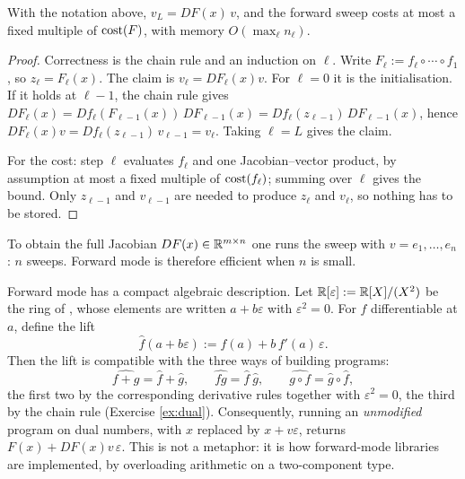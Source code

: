 \documentclass[11pt,a4paper]{article}
\begin{document}
\begin{proposition}\label{prop:forward}
With the notation above, $v_L = DF(x)\,v$, and the forward sweep costs at most a fixed multiple of
$\operatorname{cost}(F)$, with memory $O(\max_\ell n_\ell)$.
\end{proposition}

\begin{proof}
Correctness is the chain rule and an induction on $\ell$. Write $F_\ell := f_\ell \circ \cdots \circ f_1$,
so $z_\ell = F_\ell(x)$. The claim is $v_\ell = DF_\ell(x)v$. For $\ell = 0$ it is the initialisation.
If it holds at $\ell-1$, the chain rule gives
$DF_\ell(x) = Df_\ell(F_{\ell-1}(x))\, DF_{\ell-1}(x) = Df_\ell(z_{\ell-1})\, DF_{\ell-1}(x)$,
hence $DF_\ell(x)v = Df_\ell(z_{\ell-1})\,v_{\ell-1} = v_\ell$. Taking $\ell = L$ gives the claim.

For the cost: step $\ell$ evaluates $f_\ell$ and one Jacobian--vector product, by assumption at most
a fixed multiple of $\operatorname{cost}(f_\ell)$; summing over $\ell$ gives the bound. Only $z_{\ell-1}$ and
$v_{\ell-1}$ are needed to produce $z_\ell$ and $v_\ell$, so nothing has to be stored.
\end{proof}

To obtain the full Jacobian $DF(x) \in \mathbb{R}^{m \times n}$ one runs the sweep with $v = e_1,\dots,e_n$:
$n$ sweeps. Forward mode is therefore efficient when $n$ is small.

\begin{remark}\label{rem:dual}
Forward mode has a compact algebraic description. Let $\mathbb{R}[\varepsilon] := \mathbb{R}[X]/(X^2)$ be the ring
of , whose elements are written $a + b\varepsilon$ with $\varepsilon^2 = 0$. For
$f$ differentiable at $a$, define the lift
\[
\widehat f(a + b\varepsilon) := f(a) + b\, f'(a)\, \varepsilon .
\]
Then the lift is compatible with the three ways of building programs:
\[
\widehat{f+g} = \widehat f + \widehat g, \qquad
\widehat{fg} = \widehat f\ \widehat g, \qquad
\widehat{g \circ f} = \widehat g \circ \widehat f ,
\]
the first two by the corresponding derivative rules together with $\varepsilon^2 = 0$, the third by
the chain rule (Exercise \ref{ex:dual}). Consequently, running an \emph{unmodified} program on dual
numbers, with $x$ replaced by $x + v\varepsilon$, returns $F(x) + DF(x)v\,\varepsilon$. This is not
a metaphor: it is how forward-mode libraries are implemented, by overloading arithmetic on a
two-component type.
\end{remark}
\end{document}
